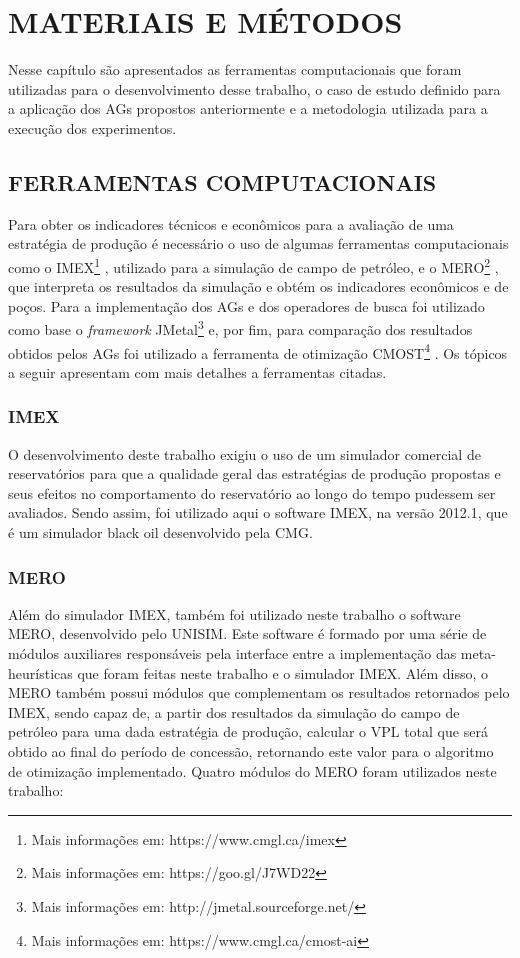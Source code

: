 \documentclass[12pt,a4paper]{report}
\begin{document}
\chapter{MATERIAIS E MÉTODOS}

Nesse capítulo são apresentados as ferramentas computacionais que foram utilizadas para o desenvolvimento desse trabalho, o caso de estudo definido para a aplicação dos AGs propostos anteriormente e a metodologia utilizada para a execução dos experimentos. 

\section{FERRAMENTAS COMPUTACIONAIS}

Para obter os indicadores técnicos e econômicos para a avaliação de uma estratégia de produção é necessário o uso de algumas ferramentas computacionais como o IMEX\footnote{Mais informações em: https://www.cmgl.ca/imex} , utilizado para a simulação de campo de petróleo, e o MERO\footnote{Mais informações em: https://goo.gl/J7WD22} , que interpreta os resultados da simulação e obtém os indicadores econômicos e de poços. Para a implementação dos AGs e dos operadores de busca foi utilizado como base o \textit{framework} JMetal\footnote{Mais informações em: http://jmetal.sourceforge.net/}  e, por fim, para comparação dos resultados obtidos pelos AGs foi utilizado a ferramenta de otimização CMOST\footnote{Mais informações em: https://www.cmgl.ca/cmost-ai} . Os tópicos a seguir apresentam com mais detalhes a ferramentas citadas.

\subsection{IMEX}

O desenvolvimento deste trabalho exigiu o uso de um simulador comercial de reservatórios para que a qualidade geral das estratégias de produção propostas e seus efeitos no comportamento do reservatório ao longo do tempo pudessem ser avaliados. Sendo assim, foi utilizado aqui o software IMEX, na versão 2012.1, que é um simulador black oil desenvolvido pela CMG. 

\subsection{MERO}

Além do simulador IMEX, também foi utilizado neste trabalho o software MERO, desenvolvido pelo UNISIM. Este software é formado por uma série de módulos auxiliares responsáveis pela interface entre a implementação das meta-heurísticas que foram feitas neste trabalho e o simulador IMEX. Além disso, o MERO também possui módulos que complementam os resultados retornados pelo IMEX, sendo capaz de, a partir dos resultados da simulação do campo de petróleo para uma dada estratégia de produção, calcular o VPL total que será obtido ao final do período de concessão, retornando este valor para o algoritmo de otimização implementado. Quatro módulos do MERO foram utilizados neste trabalho:
\end{document}
